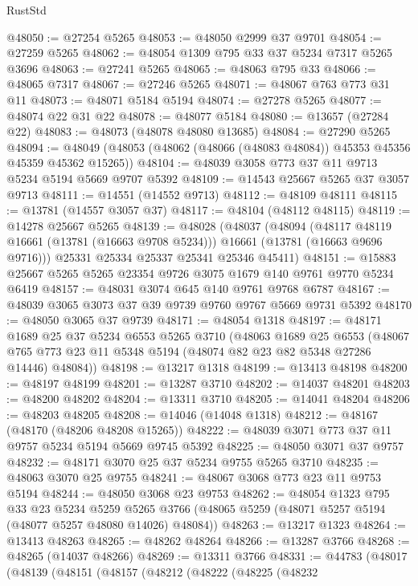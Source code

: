 \begin{lexlean}{RustStd}
\begin{coremodule}
@48050 := @27254 @5265
@48053 := @48050 @2999 @37 @9701
@48054 := @27259 @5265
@48062 := @48054 @1309 @795 @33 @37 @5234 @7317 @5265 @3696
@48063 := @27241 @5265
@48065 := @48063 @795 @33
@48066 := @48065 @7317
@48067 := @27246 @5265
@48071 := @48067 @763 @773 @31 @11
@48073 := @48071 @5184 @5194
@48074 := @27278 @5265
@48077 := @48074 @22 @31 @22
@48078 := @48077 @5184
@48080 := @13657 (@27284 @22)
@48083 := @48073 (@48078 @48080 @13685)
@48084 := @27290 @5265
@48094 := @48049 (@48053 (@48062 (@48066 (@48083 @48084)) @45353 @45356 @45359 @45362 @15265))
@48104 := @48039 @3058 @773 @37 @11 @9713 @5234 @5194 @5669 @9707 @5392
@48109 := @14543 @25667 @5265 @37 @3057 @9713
@48111 := @14551 (@14552 @9713)
@48112 := @48109 @48111
@48115 := @13781 (@14557 @3057 @37)
@48117 := @48104 (@48112 @48115)
@48119 := @14278 @25667 @5265
@48139 := @48028
    (@48037
      (@48094
        (@48117 @48119 @16661 (@13781 (@16663 @9708 @5234)))
        @16661
        (@13781 (@16663 @9696 @9716)))
      @25331
      @25334
      @25337
      @25341
      @25346
      @45411)
@48151 := @15883 @25667 @5265 @5265 @23354 @9726 @3075 @1679 @140 @9761 @9770 @5234 @6419
@48157 := @48031 @3074 @645 @140 @9761 @9768 @6787
@48167 := @48039 @3065 @3073 @37 @39 @9739 @9760 @9767 @5669 @9731 @5392
@48170 := @48050 @3065 @37 @9739
@48171 := @48054 @1318
@48197 := @48171
    @1689
    @25
    @37
    @5234
    @6553
    @5265
    @3710
    (@48063
      @1689
      @25
      @6553
      (@48067 @765 @773 @23 @11 @5348 @5194 (@48074 @82 @23 @82 @5348 @27286 @14446) @48084))
@48198 := @13217 @1318
@48199 := @13413 @48198
@48200 := @48197 @48199
@48201 := @13287 @3710
@48202 := @14037 @48201
@48203 := @48200 @48202
@48204 := @13311 @3710
@48205 := @14041 @48204
@48206 := @48203 @48205
@48208 := @14046 (@14048 @1318)
@48212 := @48167 (@48170 (@48206 @48208 @15265))
@48222 := @48039 @3071 @773 @37 @11 @9757 @5234 @5194 @5669 @9745 @5392
@48225 := @48050 @3071 @37 @9757
@48232 := @48171 @3070 @25 @37 @5234 @9755 @5265 @3710
@48235 := @48063 @3070 @25 @9755
@48241 := @48067 @3068 @773 @23 @11 @9753 @5194
@48244 := @48050 @3068 @23 @9753
@48262 := @48054
    @1323
    @795
    @33
    @23
    @5234
    @5259
    @5265
    @3766
    (@48065 @5259 (@48071 @5257 @5194 (@48077 @5257 @48080 @14026) @48084))
@48263 := @13217 @1323
@48264 := @13413 @48263
@48265 := @48262 @48264
@48266 := @13287 @3766
@48268 := @48265 (@14037 @48266)
@48269 := @13311 @3766
@48331 := @44783
    (@48017
      (@48139
        (@48151
          (@48157
            (@48212
              (@48222
                (@48225
                  (@48232

\end{coremodule}
\end{lexlean}
